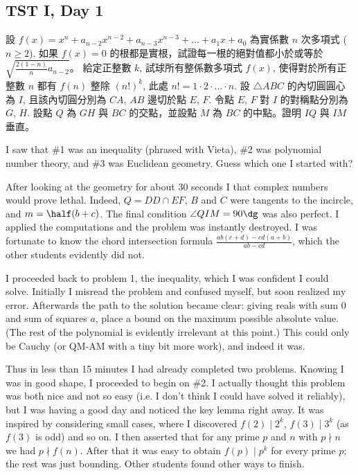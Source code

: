 \documentclass[11pt]{scrreprt}
\begin{document}
\subsection{TST I, Day 1}
\begin{enumerate}
  \ii 設 $f(x) = x^n + a_{n-2} x^{n-2} + a_{n-3}x^{n-3} + \dots + a_1 x + a_0$ 為實係數 $n$ 次多項式 ($n \ge 2$). 如果 $f(x) = 0$ 的根都是實根，試證每一根的絕對值都小於或等於 $\sqrt{\frac{2(1-n)}{n} a_{n-2}}$。
  \ii 給定正整數 $k$, 試球所有整係數多項式 $f(x)$, 使得對於所有正整數 $n$ 都有 $f(n)$ 整除 $(n!)^k$, 此處 $n! = 1 \cdot 2 \cdot \ldots \cdot n$.
  \ii 設 $\triangle ABC$ 的內切圓圓心為 $I$, 且該內切圓分別為 $CA$, $AB$ 邊切於點 $E$, $F$. 令點 $E$, $F$ 對 $I$ 的對稱點分別為 $G$, $H$.
  設點 $Q$ 為 $GH$ 與 $BC$ 的交點，並設點 $M$ 為 $BC$ 的中點。證明 $IQ$ 與 $IM$ 垂直。
\end{enumerate}
I saw that \#1 was an inequality (phrased with Vieta), \#2 was polynomial number theory, and \#3 was Euclidean geometry. Guess which one I started with?

After looking at the geometry for about 30 seconds I that complex numbers would prove lethal. Indeed, $Q = DD \cap EF$, $B$ and $C$ were tangents to the incircle, and $m = \half (b+c)$. The final condition $\angle QIM = 90\dg$ was also perfect. I applied the computations and the problem was instantly destroyed. I was fortunate to know the chord intersection formula $\frac{ab(c+d)-cd(a+b)}{ab-cd}$, which the other students evidently did not.

I proceeded back to problem 1, the inequality, which I was confident I could solve. Initially I misread the problem and confused myself, but soon realized my error. Afterwards the path to the solution became clear: giving reals with sum $0$ and sum of squares $a$, place a bound on the maximum possible absolute value. (The rest of the polynomial is evidently irrelevant at this point.) This could only be Cauchy (or QM-AM with a tiny bit more work), and indeed it was.

Thus in less than 15 minutes I had already completed two problems. Knowing I was in good shape, I proceeded to begin on \#2. I actually thought this problem was both nice and not so easy ({i.e.} I don't think I could have solved it reliably), but I was having a good day and noticed the key lemma right away. It was inspired by considering small cases, where I discovered $f(2) \mid 2^k$, $f(3) \mid 3^k$ (as $f(3)$ is odd) and so on. I then asserted that for any prime $p$ and $n$ with $p \nmid n$ we had $p \nmid f(n)$. After that it was easy to obtain $f(p) \mid p^k$ for every prime $p$; the rest was just bounding. Other students found other ways to finish.
\end{document}
